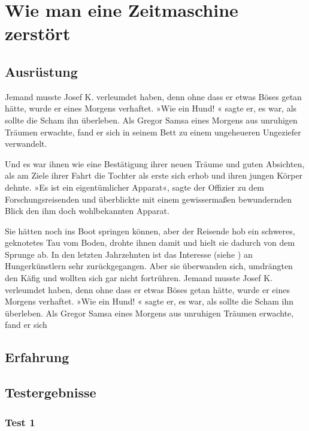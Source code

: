 \chapter{Wie man eine Zeitmaschine zerstört}

\lipsum[1-3]

\section{Ausrüstung}

Jemand musste Josef K. verleumdet haben, denn ohne dass er etwas Böses getan hätte, wurde er eines Morgens verhaftet. »Wie ein Hund! « sagte er, es war, als sollte die Scham ihn überleben. Als Gregor Samsa eines Morgens aus unruhigen Träumen erwachte, fand er sich in seinem Bett zu einem ungeheueren Ungeziefer verwandelt.

Und es war ihnen wie eine Bestätigung ihrer neuen Träume und guten Absichten, als am Ziele ihrer Fahrt die Tochter als erste sich erhob und ihren jungen Körper dehnte. »Es ist ein eigentümlicher Apparat«, sagte der Offizier zu dem Forschungsreisenden und überblickte mit einem gewissermaßen bewundernden Blick den ihm doch wohlbekannten Apparat.

Sie hätten noch ins Boot springen können, aber der Reisende hob ein schweres, geknotetes Tau vom Boden, drohte ihnen damit und hielt sie dadurch von dem Sprunge ab. In den letzten Jahrzehnten ist das Interesse (siehe ) an Hungerkünstlern sehr zurückgegangen. Aber sie überwanden sich, umdrängten den Käfig und wollten sich gar nicht fortrühren. Jemand musste Josef K. verleumdet haben, denn ohne dass er etwas Böses getan hätte, wurde er eines Morgens verhaftet. »Wie ein Hund! « sagte er, es war, als sollte die Scham ihn überleben. Als Gregor Samsa eines Morgens aus unruhigen Träumen erwachte, fand er sich

\section{Erfahrung}

\lipsum[1-1]

\section{Testergebnisse}

\lipsum[1-1]

\subsection{Test 1}


